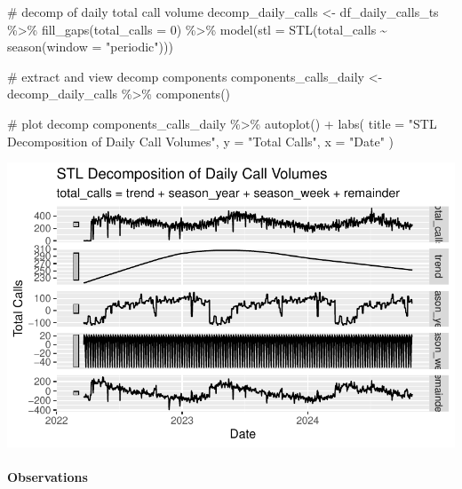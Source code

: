 \documentclass[
  letterpaper,
  DIV=11,
  numbers=noendperiod]{scrartcl}
\let\oldparagraph\paragraph
\renewcommand{\paragraph}[1]{\oldparagraph{#1}\mbox{}}
\newenvironment{Shaded}{\begin{snugshade}}{\end{snugshade}}
\newcommand{\AttributeTok}[1]{\textcolor[rgb]{0.40,0.45,0.13}{#1}}
\newcommand{\CommentTok}[1]{\textcolor[rgb]{0.37,0.37,0.37}{#1}}
\newcommand{\DecValTok}[1]{\textcolor[rgb]{0.68,0.00,0.00}{#1}}
\newcommand{\FunctionTok}[1]{\textcolor[rgb]{0.28,0.35,0.67}{#1}}
\newcommand{\NormalTok}[1]{\textcolor[rgb]{0.00,0.23,0.31}{#1}}
\newcommand{\OtherTok}[1]{\textcolor[rgb]{0.00,0.23,0.31}{#1}}
\newcommand{\SpecialCharTok}[1]{\textcolor[rgb]{0.37,0.37,0.37}{#1}}
\newcommand{\StringTok}[1]{\textcolor[rgb]{0.13,0.47,0.30}{#1}}
\begin{document}
\begin{Shaded}
\begin{Highlighting}[]
\CommentTok{\# decomp of daily total call volume}
\NormalTok{decomp\_daily\_calls }\OtherTok{\textless{}{-}}\NormalTok{ df\_daily\_calls\_ts }\SpecialCharTok{\%\textgreater{}\%}
  \FunctionTok{fill\_gaps}\NormalTok{(}\AttributeTok{total\_calls =} \DecValTok{0}\NormalTok{) }\SpecialCharTok{\%\textgreater{}\%}
  \FunctionTok{model}\NormalTok{(}\AttributeTok{stl =} \FunctionTok{STL}\NormalTok{(total\_calls }\SpecialCharTok{\textasciitilde{}} \FunctionTok{season}\NormalTok{(}\AttributeTok{window =} \StringTok{"periodic"}\NormalTok{)))}

\CommentTok{\# extract and view decomp components}
\NormalTok{components\_calls\_daily }\OtherTok{\textless{}{-}}\NormalTok{ decomp\_daily\_calls }\SpecialCharTok{\%\textgreater{}\%}
  \FunctionTok{components}\NormalTok{()}

\CommentTok{\# plot decomp}
\NormalTok{components\_calls\_daily }\SpecialCharTok{\%\textgreater{}\%}
  \FunctionTok{autoplot}\NormalTok{() }\SpecialCharTok{+}
  \FunctionTok{labs}\NormalTok{(}
    \AttributeTok{title =} \StringTok{"STL Decomposition of Daily Call Volumes"}\NormalTok{, }
    \AttributeTok{y =} \StringTok{"Total Calls"}\NormalTok{, }
    \AttributeTok{x =} \StringTok{"Date"}
\NormalTok{  )}
\end{Highlighting}
\end{Shaded}

\includegraphics{final_proj_group1_files/figure-pdf/daily-3.pdf}

\paragraph{Observations}\label{observations-4}
\end{document}
